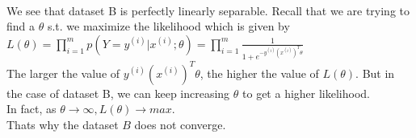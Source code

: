 \begin{answer}
\begin{figure}
  \label{fig:Dateset B with decision boundary after 30,000 iterations}
\end{figure}\\
We see that dataset B is perfectly linearly separable. Recall that we are trying to find a $\theta$ s.t. we maximize the likelihood which is given by\\
$L(\theta)=\prod_{i=1}^{m}p(Y=y^{(i)}|x^{(i)};\theta)=\prod_{i=1}^{m}\frac{1}{1+e^{-y^{(i)}(x^{(i)})^T \theta}}$\\
The larger the value of $y^{(i)}(x^{(i)})^T \theta$, the higher the value of $L(\theta)$. But in the case of dataset B, we can keep increasing $\theta$ to get a higher likelihood.\\
In fact, as $\theta \rightarrow \infty, L(\theta) \rightarrow max$.\\
Thats why the dataset $B$ does not converge.
\end{answer}
